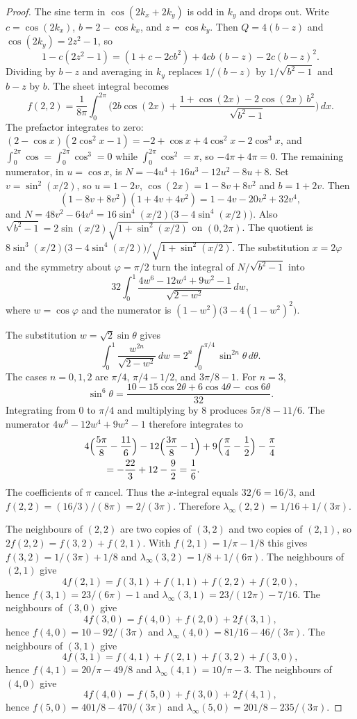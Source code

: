 \begin{proof}
The sine term in \(\cos(2k_x+2k_y)\) is odd in \(k_y\) and drops out.
Write \(c=\cos(2k_x)\), \(b=2-\cos k_x\), and \(z=\cos k_y\).
Then \(Q=4(b-z)\) and \(\cos(2k_y)=2z^2-1\), so
\[
1-c(2z^2-1)
=(1+c-2cb^2)+4cb\,(b-z)-2c(b-z)^2.
\]
Dividing by \(b-z\) and averaging in \(k_y\) replaces \(1/(b-z)\) by
\(1/\sqrt{b^2-1}\) and \(b-z\) by \(b\).
The sheet integral becomes
\[
f(2,2)
=\frac{1}{8\pi}\int_0^{2\pi}
\Biggl(
2b\cos(2x)
+\frac{1+\cos(2x)-2\cos(2x)\,b^2}{\sqrt{b^2-1}}
\Biggr)\,dx.
\]
The prefactor integrates to zero:
\((2-\cos x)(2\cos^2 x-1)=-2+\cos x+4\cos^2 x-2\cos^3 x\),
and \(\int_0^{2\pi}\cos=\int_0^{2\pi}\cos^3=0\) while
\(\int_0^{2\pi}\cos^2=\pi\), so \(-4\pi+4\pi=0\).
The remaining numerator, in \(u=\cos x\), is
\(N=-4u^4+16u^3-12u^2-8u+8\).
Set \(v=\sin^2(x/2)\), so \(u=1-2v\), \(\cos(2x)=1-8v+8v^2\) and
\(b=1+2v\). Then
\[
(1-8v+8v^2)(1+4v+4v^2)=1-4v-20v^2+32v^4,
\]
and \(N=48v^2-64v^4=16\sin^4(x/2)\bigl(3-4\sin^4(x/2)\bigr)\).
Also \(\sqrt{b^2-1}=2\sin(x/2)\sqrt{1+\sin^2(x/2)}\) on \((0,2\pi)\).
The quotient is
\(8\sin^3(x/2)\bigl(3-4\sin^4(x/2)\bigr)/\sqrt{1+\sin^2(x/2)}\).
The substitution \(x=2\varphi\) and the symmetry about \(\varphi=\pi/2\)
turn the integral of \(N/\sqrt{b^2-1}\) into
\[
32\int_0^1\frac{4w^6-12w^4+9w^2-1}{\sqrt{2-w^2}}\,dw,
\]
where \(w=\cos\varphi\) and the numerator is
\((1-w^2)\bigl(3-4(1-w^2)^2\bigr)\).

The substitution \(w=\sqrt{2}\sin\theta\) gives
\[
\int_0^1\frac{w^{2n}}{\sqrt{2-w^2}}\,dw
=2^n\int_0^{\pi/4}\sin^{2n}\theta\,d\theta.
\]
The cases \(n=0,1,2\) are \(\pi/4\), \(\pi/4-1/2\), and \(3\pi/8-1\).
For \(n=3\),
\[
\sin^6\theta
=\frac{10-15\cos 2\theta+6\cos 4\theta-\cos 6\theta}{32}.
\]
Integrating from \(0\) to \(\pi/4\) and multiplying by \(8\) produces
\(5\pi/8-11/6\).
The numerator \(4w^6-12w^4+9w^2-1\) therefore integrates to
\begin{align*}
&4\Bigl(\frac{5\pi}{8}-\frac{11}{6}\Bigr)
-12\Bigl(\frac{3\pi}{8}-1\Bigr)
+9\Bigl(\frac\pi4-\frac12\Bigr)
-\frac\pi4\\
&\qquad=-\frac{22}{3}+12-\frac92
=\frac16.
\end{align*}
The coefficients of \(\pi\) cancel.
Thus the \(x\)-integral equals \(32/6=16/3\), and
\(f(2,2)=(16/3)/(8\pi)=2/(3\pi)\).
Therefore \(\lambda_\infty(2,2)=1/16+1/(3\pi)\).

The neighbours of \((2,2)\) are two copies of \((3,2)\) and two copies of
\((2,1)\), so \(2f(2,2)=f(3,2)+f(2,1)\).
With \(f(2,1)=1/\pi-1/8\) this gives \(f(3,2)=1/(3\pi)+1/8\) and
\(\lambda_\infty(3,2)=1/8+1/(6\pi)\).
The neighbours of \((2,1)\) give
\[
4f(2,1)=f(3,1)+f(1,1)+f(2,2)+f(2,0),
\]
hence \(f(3,1)=23/(6\pi)-1\) and
\(\lambda_\infty(3,1)=23/(12\pi)-7/16\).
The neighbours of \((3,0)\) give
\[
4f(3,0)=f(4,0)+f(2,0)+2f(3,1),
\]
hence \(f(4,0)=10-92/(3\pi)\) and
\(\lambda_\infty(4,0)=81/16-46/(3\pi)\).
The neighbours of \((3,1)\) give
\[
4f(3,1)=f(4,1)+f(2,1)+f(3,2)+f(3,0),
\]
hence \(f(4,1)=20/\pi-49/8\) and \(\lambda_\infty(4,1)=10/\pi-3\).
The neighbours of \((4,0)\) give
\[
4f(4,0)=f(5,0)+f(3,0)+2f(4,1),
\]
hence \(f(5,0)=401/8-470/(3\pi)\) and
\(\lambda_\infty(5,0)=201/8-235/(3\pi)\).


\end{proof}
